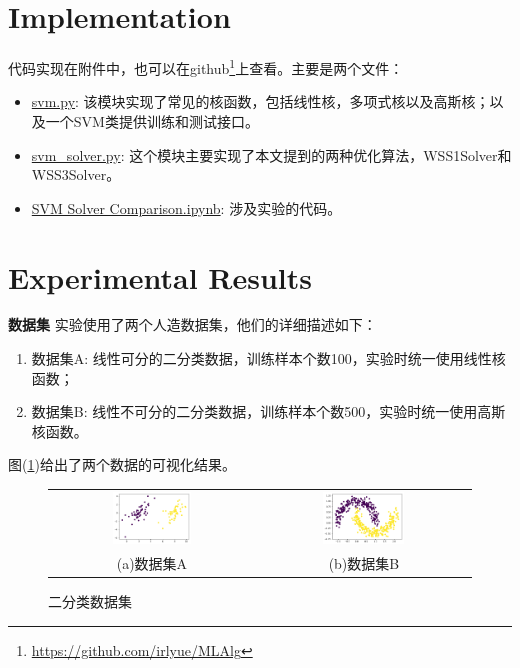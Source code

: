 \documentclass[11pt]{article}
\begin{document}
\section{Implementation}\label{implementation}
代码实现在附件中，也可以在github\footnote{\url{https://github.com/irlyue/MLAlg}}上查看。主要是两个文件：
\begin{itemize}
\item \href{https://github.com/Irlyue/MLAlg/blob/master/code/svm/svm.py}{svm.py}: 该模块实现了常见的核函数，包括线性核，多项式核以及高斯核；以及一个SVM类提供训练和测试接口。
\item\href{https://github.com/Irlyue/MLAlg/blob/master/code/svm/svm_solver.py}{svm\_solver.py}: 这个模块主要实现了本文提到的两种优化算法，WSS1Solver和WSS3Solver。
\item\href{https://github.com/Irlyue/MLAlg/blob/master/notebook/svm/SVM\%20Solver\%20Comparison.ipynb}{SVM Solver Comparison.ipynb}: 涉及实验的代码。
\end{itemize}
\section{Experimental Results}\label{experiment}
\textbf{数据集 }实验使用了两个人造数据集，他们的详细描述如下：
\begin{enumerate}
	\item 数据集A: 线性可分的二分类数据，训练样本个数100，实验时统一使用线性核函数；
	\item 数据集B: 线性不可分的二分类数据，训练样本个数500，实验时统一使用高斯核函数。
\end{enumerate}
图(\ref{data})给出了两个数据的可视化结果。
\begin{figure}
	\centering
	\setlength{\tabcolsep}{0.05\textwidth}
	\begin{tabular}{cc}
		\includegraphics[width=0.4\textwidth]{images/img15.png} & 
		\includegraphics[width=0.4\textwidth]{images/img17.png}\\
		(a)数据集A & (b)数据集B 
	\end{tabular}
	\caption{二分类数据集}
	\label{data}
\end{figure}
\end{document}
